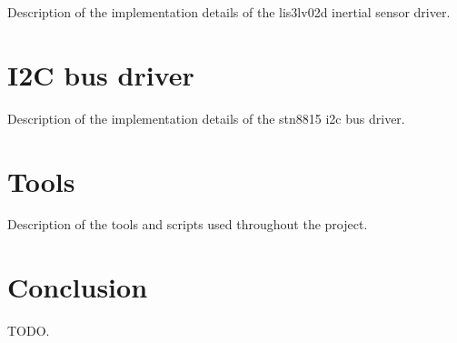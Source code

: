 \documentclass[a4paper,10pt]{article}
\begin{document}
\begin{multicols}{2}
Description of the implementation details of the lis3lv02d inertial sensor
driver.



\section{I2C bus driver}
\label{sec:i2c_bus_driver}

Description of the implementation details of the stn8815 i2c bus driver.



\section{Tools}
\label{sec:tools}

Description of the tools and scripts used throughout the project.



\section{Conclusion}

TODO.







\end{multicols}
\end{document}
